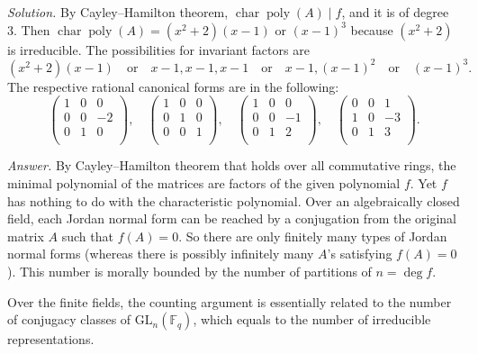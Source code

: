 \documentclass{mathproblems}
\newcommand\F{\mathbb{F}}
\newcommand\GL{\mathrm{GL}}
\begin{document}
\begin{questions}
\textit{Solution.} By Cayley--Hamilton theorem, $\operatorname{char}\operatorname{poly}(A)\mid f$, and it is of degree 3. Then $\operatorname{char}\operatorname{poly}(A)=(x^2+2)(x-1)$ or $(x - 1)^3$ because $(x^2+2)$ is irreducible. The possibilities for invariant factors are 
$$
(x^2+2)(x-1)\quad \text{or}\quad x-1,x-1,x-1\quad \text{or}\quad x-1,(x-1)^2\quad \text{or}\quad (x-1)^3.
$$ The respective rational canonical forms are in the following:
$$
\begin{pmatrix}
    1 & 0 & 0\\
    0 & 0 & -2\\
    0 & 1 & 0\\
\end{pmatrix}, \quad
\begin{pmatrix}
    1 & 0 & 0\\
    0 & 1 & 0\\
    0 & 0 & 1\\
\end{pmatrix}, \quad
\begin{pmatrix}
    1 & 0 & 0\\
    0 & 0 & -1\\
    0 & 1 & 2\\
\end{pmatrix}, \quad
\begin{pmatrix}
    0 & 0 & 1\\
    1 & 0 & -3\\
    0 & 1 & 3\\
\end{pmatrix}.
$$


\textit{Answer.} By Cayley--Hamilton theorem that holds over all commutative rings, the minimal polynomial of the matrices are factors of the given polynomial $f$. Yet $f$ has nothing to do with the characteristic polynomial. Over an algebraically closed field, each Jordan normal form can be reached by a conjugation from the original matrix $A$ such that $f(A)=0$. So there are only finitely many types of Jordan normal forms (whereas there is possibly infinitely many $A$'s satisfying $f(A)=0$). This number is morally bounded by the number of partitions of $n=\deg f$.

Over the finite fields, the counting argument is essentially related to the number of conjugacy classes of $\GL_n(\F_q)$, which equals to the number of irreducible representations. 



\end{questions}
\end{document}
